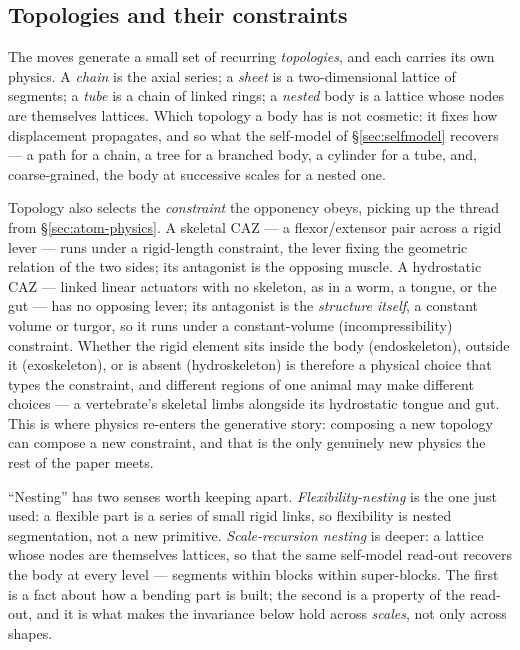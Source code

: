 \documentclass{article}
\begin{document}
\subsection{Topologies and their constraints}\label{sec:kit-topology}

The moves generate a small set of recurring \emph{topologies}, and each
carries its own physics.  A \emph{chain} is the axial series; a
\emph{sheet} is a two-dimensional lattice of segments; a \emph{tube} is
a chain of linked rings; a \emph{nested} body is a lattice whose nodes
are themselves lattices.  Which topology a body has is not cosmetic: it
fixes how displacement propagates, and so what the self-model of
\S\ref{sec:selfmodel} recovers --- a path for a chain, a tree for a
branched body, a cylinder for a tube, and, coarse-grained, the body at
successive scales for a nested one.

Topology also selects the \emph{constraint} the opponency obeys,
picking up the thread from \S\ref{sec:atom-physics}.  A skeletal CAZ
--- a flexor/extensor pair across a rigid lever --- runs under a
rigid-length constraint, the lever fixing the geometric relation of the
two sides; its antagonist is the opposing muscle.  A hydrostatic CAZ ---
linked linear actuators with no skeleton, as in a worm, a tongue, or the
gut --- has no opposing lever; its antagonist is the \emph{structure
itself}, a constant volume or turgor, so it runs under a constant-volume
(incompressibility) constraint.  Whether the rigid element sits inside
the body (endoskeleton), outside it (exoskeleton), or is absent
(hydroskeleton) is therefore a physical choice that types the
constraint, and different regions of one animal may make different
choices --- a vertebrate's skeletal limbs alongside its hydrostatic
tongue and gut.  This is where physics re-enters the generative story:
composing a new topology can compose a new constraint, and that is the
only genuinely new physics the rest of the paper meets.

``Nesting'' has two senses worth keeping apart.
\emph{Flexibility-nesting} is the one just used: a flexible part is a
series of small rigid links, so flexibility is nested segmentation, not
a new primitive.  \emph{Scale-recursion nesting} is deeper: a lattice
whose nodes are themselves lattices, so that the same self-model
read-out recovers the body at every level --- segments within blocks
within super-blocks.  The first is a fact about how a bending part is
built; the second is a property of the read-out, and it is what makes
the invariance below hold across \emph{scales}, not only across shapes.
\end{document}
